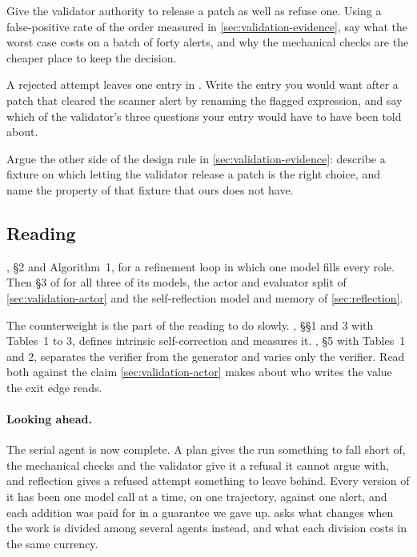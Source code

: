 \be

\item Give the validator authority to release a patch as well as refuse one. Using a false-positive
rate of the order measured in \cref{sec:validation-evidence}, say what the worst case costs on a
batch of forty alerts, and why the mechanical checks are the cheaper place to keep the decision.

\item A rejected attempt leaves one entry in . Write the entry you would want
after a patch that cleared the scanner alert by renaming the flagged expression, and say which of
the validator's three questions your entry would have to have been told about.

\item Argue the other side of the design rule in \cref{sec:validation-evidence}: describe a fixture
on which letting the validator release a patch is the right choice, and name the property of that
fixture that ours does not have.

\ee

\subsection{Reading}

\citet{madaan2023selfrefine}, \S2 and Algorithm~1, for a refinement loop in which one
model fills every role. Then \S3 of \citet{shinn2023reflexion} for all three of its models, the
actor and evaluator split of \cref{sec:validation-actor} and the self-reflection model and memory of
\cref{sec:reflection}.

The counterweight is the part of the reading to do slowly. \citet{huang2024selfcorrect}, \S\S1 and 3
with Tables~1 to 3, defines intrinsic self-correction and measures it. \citet{stechly2025selfverification},
\S5 with Tables~1 and 2, separates the verifier from the generator and varies only the verifier.
Read both against the claim \cref{sec:validation-actor} makes about who writes the value the exit
edge reads.

\paragraph{Looking ahead.}
The serial agent is now complete. A plan gives the run something to fall short of, the mechanical
checks and the validator give it a refusal it cannot argue with, and reflection gives a refused
attempt something to leave behind. Every version of it has been one model call at a time, on one
trajectory, against one alert, and each addition was paid for in a guarantee we gave up.
 asks what changes when the work is divided among several agents instead, and
what each division costs in the same currency.
